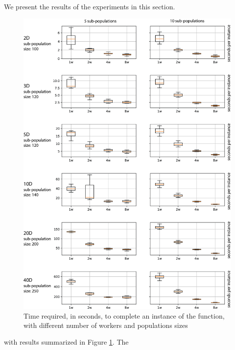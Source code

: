 \documentclass[review]{elsarticle}
\begin{document}
We present the results of the experiments in this section.
%
\begin{figure}[h!p]
    \centering
    \includegraphics[width=\textwidth]{sp_size_worker}
    \caption{Time required, in seconds, to complete an instance of the function, with different number of workers and populations sizes }
    \label{fig:spworker}
\end{figure}
%
%
%
with results summarized in Figure \ref{fig:spworker}.  The
\end{document}
